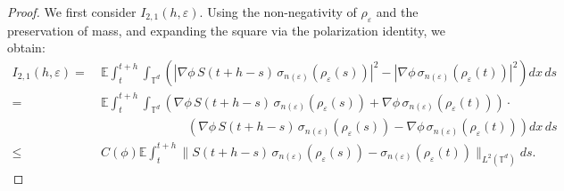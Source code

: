 \documentclass[UTF-8,reqno]{amsart}
\numberwithin{equation}{section}
\def\leq{\leqslant}
\def\leq{\leqslant}
\begin{document}
\begin{proof}
We first consider $I_{2,1}(h,\varepsilon)$. Using the non-negativity of $\rho_{\varepsilon}$ and the preservation of mass, and expanding the square via the polarization identity, we obtain:
\begin{align*}
I_{2,1}(h,\varepsilon) 
=&\ \mathbb{E} \int_t^{t+h} \int_{\mathbb{T}^d} \left( 
|\nabla\phi\, S(t+h - s)\, \sigma_{n(\varepsilon)}(\rho_{\varepsilon}(s))|^2 
- |\nabla\phi\, \sigma_{n(\varepsilon)}(\rho_{\varepsilon}(t))|^2 
\right) dx\, ds \\
=&\ \mathbb{E} \int_t^{t+h} \int_{\mathbb{T}^d} \left( 
\nabla\phi\, S(t+h - s)\, \sigma_{n(\varepsilon)}(\rho_{\varepsilon}(s)) 
+ \nabla\phi\, \sigma_{n(\varepsilon)}(\rho_{\varepsilon}(t)) 
\right) \cdot \\
&\hspace{3cm} \left( 
\nabla\phi\, S(t+h - s)\, \sigma_{n(\varepsilon)}(\rho_{\varepsilon}(s)) 
- \nabla\phi\, \sigma_{n(\varepsilon)}(\rho_{\varepsilon}(t)) 
\right) dx\, ds \\
\leq&\ C(\phi) \mathbb{E} \int_t^{t+h} \| S(t+h - s)\, \sigma_{n(\varepsilon)}(\rho_{\varepsilon}(s)) 
- \sigma_{n(\varepsilon)}(\rho_{\varepsilon}(t)) \|_{L^2(\mathbb{T}^d)} ds.
\end{align*}


\end{proof}
\end{document}
